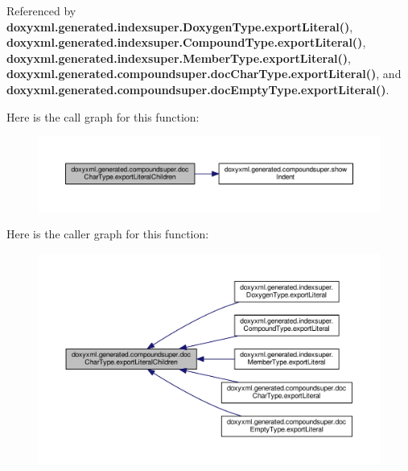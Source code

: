 Referenced by {\bf doxyxml.\+generated.\+indexsuper.\+Doxygen\+Type.\+export\+Literal()}, {\bf doxyxml.\+generated.\+indexsuper.\+Compound\+Type.\+export\+Literal()}, {\bf doxyxml.\+generated.\+indexsuper.\+Member\+Type.\+export\+Literal()}, {\bf doxyxml.\+generated.\+compoundsuper.\+doc\+Char\+Type.\+export\+Literal()}, and {\bf doxyxml.\+generated.\+compoundsuper.\+doc\+Empty\+Type.\+export\+Literal()}.



Here is the call graph for this function\+:
\nopagebreak
\begin{figure}[H]
\begin{center}
\leavevmode
\includegraphics[width=350pt]{d3/dba/classdoxyxml_1_1generated_1_1compoundsuper_1_1docCharType_adf036ec214d3f127c40b6e11c061313b_cgraph}
\end{center}
\end{figure}




Here is the caller graph for this function\+:
\nopagebreak
\begin{figure}[H]
\begin{center}
\leavevmode
\includegraphics[width=350pt]{d3/dba/classdoxyxml_1_1generated_1_1compoundsuper_1_1docCharType_adf036ec214d3f127c40b6e11c061313b_icgraph}
\end{center}
\end{figure}


